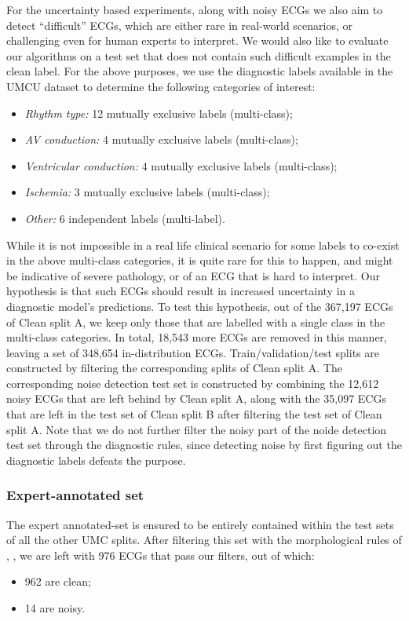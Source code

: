 \documentclass[a4paper,10pt]{article}
\newcommand{\refsec}[1]{\Cref{#1}, \emph{\nameref{#1}}}
\begin{document}
For the uncertainty based experiments, along with noisy ECGs we also aim to detect ``difficult'' ECGs, which are either rare in real-world scenarios, or challenging even for human experts to interpret. We would also like to evaluate our algorithms on a test set that does not contain such difficult examples in the clean label. For the above purposes, we use the diagnostic labels available in the UMCU dataset to determine the following categories of interest:
\begin{itemize}
	\item \emph{Rhythm type:} 12 mutually exclusive labels (multi-class);
	\item \emph{AV conduction:} 4 mutually exclusive labels (multi-class);
	\item \emph{Ventricular conduction:} 4 mutually exclusive labels (multi-class);
	\item \emph{Ischemia:} 3 mutually exclusive labels (multi-class);
	\item \emph{Other:} 6 independent labels (multi-label).
\end{itemize}
While it is not impossible in a real life clinical scenario for some labels to co-exist in the above multi-class categories, it is quite rare for this to happen, and might be indicative of severe pathology, or of an ECG that is hard to interpret. Our hypothesis is that such ECGs should result in increased uncertainty in a diagnostic model's predictions. To test this hypothesis, out of the 367,197 ECGs of Clean split A, we keep only those that are labelled with a single class in the multi-class categories. In total, 18,543 more ECGs are removed in this manner, leaving a set of 348,654 in-distribution ECGs. Train/validation/test splits are constructed by filtering the corresponding splits of Clean split A. The corresponding noise detection test set is constructed by combining the 12,612 noisy ECGs that are left behind by Clean split A, along with the 35,097 ECGs that are left in the test set of Clean split B after filtering the test set of Clean split A. Note that we do not further filter the noisy part of the noide detection test set through the diagnostic rules, since detecting noise by first figuring out the diagnostic labels defeats the purpose.

\subsubsection{Expert-annotated set}

The expert annotated-set is ensured to be entirely contained within the test sets of all the other UMC splits. After filtering this set with the morphological rules of \refsec{sec:clean_split_a}, we are left with 976 ECGs that pass our filters, out of which:
\begin{itemize}
	\item 962 are clean;
	\item 14 are noisy.
\end{itemize}
\end{document}

